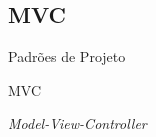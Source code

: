 \documentclass[
	9pt, %
	t, %
]{beamer}
\begin{document}

\subsection{MVC}

\begin{frame}
	\begin{center}

		\bigskip\bigskip\bigskip\bigskip %
		{\Large Padrões de Projeto}

		\bigskip\bigskip %
		{\Huge MVC}

		\smallskip
		{\small \textit{Model-View-Controller}}
	\end{center}

\end{frame}
\end{document}
